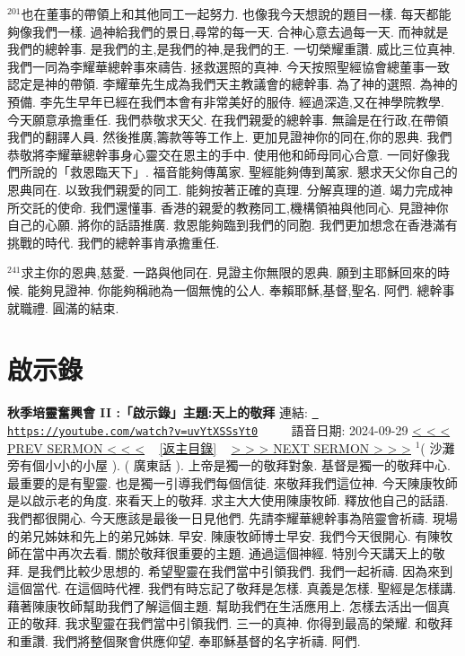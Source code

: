 \documentclass{book}
\begin{document}
$^{201}$也在董事的帶領上和其他同工一起努力.
也像我今天想說的題目一樣.
每天都能夠像我們一樣.
過神給我們的景日,尋常的每一天.
合神心意去過每一天.
而神就是我們的總幹事.
是我們的主,是我們的神,是我們的王.
一切榮耀重讚.
威比三位真神.
我們一同為李耀華總幹事來禱告.
拯救選照的真神.
今天按照聖經協會總董事一致認定是神的帶領.
李耀華先生成為我們天主教議會的總幹事.
為了神的選照.
為神的預備.
李先生早年已經在我們本會有非常美好的服侍.
經過深造,又在神學院教學.
今天願意承擔重任.
我們恭敬求天父.
在我們親愛的總幹事.
無論是在行政,在帶領我們的翻譯人員.
然後推廣,籌款等等工作上.
更加見證神你的同在,你的恩典.
我們恭敬將李耀華總幹事身心靈交在恩主的手中.
使用他和師母同心合意.
一同好像我們所說的「救恩臨天下」.
福音能夠傳萬家.
聖經能夠傳到萬家.
懇求天父你自己的恩典同在.
以致我們親愛的同工.
能夠按著正確的真理.
分解真理的道.
竭力完成神所交託的使命.
我們還懂事.
香港的親愛的教務同工,機構領袖與他同心.
見證神你自己的心願.
將你的話語推廣.
救恩能夠臨到我們的同胞.
我們更加想念在香港滿有挑戰的時代.
我們的總幹事肯承擔重任.

$^{241}$求主你的恩典,慈愛.
一路與他同在.
見證主你無限的恩典.
願到主耶穌回來的時候.
能夠見證神.
你能夠稱祂為一個無愧的公人.
奉賴耶穌,基督,聖名.
阿們.
總幹事就職禮.
圓滿的結束.
\newpage



\section{啟示錄}
\label{sec:uvYtXSSsYt0}
\textbf{秋季培靈奮興會 II :「啟示錄」主題:天上的敬拜}
\newline
\newline
連結: \href{https://youtube.com/watch?v=uvYtXSSsYt0}{\texttt{ https://youtube.com/watch?v=uvYtXSSsYt0}} ~~~~ 語音日期: 2024-09-29 
\newline
\newline
\hyperref[sec:lB_bfqbs0xw]{\small{< < < PREV SERMON < < <}}
~
\hyperref[sec:index]{\small{[返主目錄]}}
~
\hyperref[sec:EjR8UEB4pjs]{\small{> > > NEXT SERMON > > >}}
\newline
\newline
$^{1}$( 沙灘旁有個小小的小屋 ).
( 廣東話 ).
上帝是獨一的敬拜對象.
基督是獨一的敬拜中心.
最重要的是有聖靈.
也是獨一引導我們每個信徒.
來敬拜我們這位神.
今天陳康牧師是以啟示老的角度.
來看天上的敬拜.
求主大大使用陳康牧師.
釋放他自己的話語.
我們都很開心.
今天應該是最後一日見他們.
先請李耀華總幹事為陪靈會祈禱.
現場的弟兄姊妹和先上的弟兄姊妹.
早安.
陳康牧師博士早安.
我們今天很開心.
有陳牧師在當中再次去看.
關於敬拜很重要的主題.
通過這個神經.
特別今天講天上的敬拜.
是我們比較少思想的.
希望聖靈在我們當中引領我們.
我們一起祈禱.
因為來到這個當代.
在這個時代裡.
我們有時忘記了敬拜是怎樣.
真義是怎樣.
聖經是怎樣講.
藉著陳康牧師幫助我們了解這個主題.
幫助我們在生活應用上.
怎樣去活出一個真正的敬拜.
我求聖靈在我們當中引領我們.
三一的真神.
你得到最高的榮耀.
和敬拜和重讚.
我們將整個聚會供應仰望.
奉耶穌基督的名字祈禱.
阿們.
\end{document}

